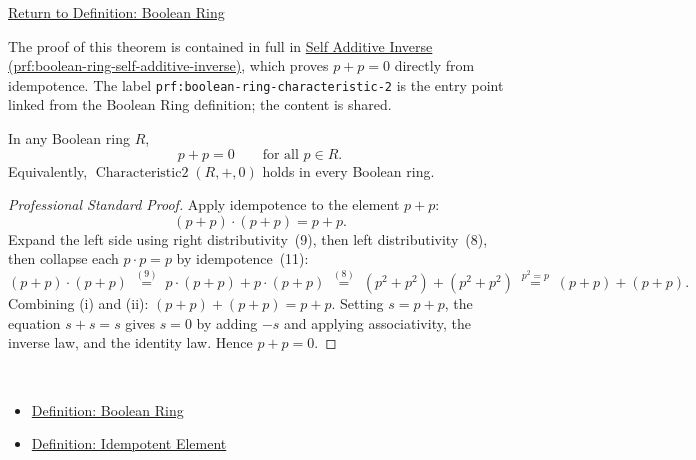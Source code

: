 \newpage
{}
\label{prf:boolean-ring-characteristic-2}

\begin{remark*}[Return]
\hyperref[def:boolean-ring]{Return to Definition: Boolean Ring}
\end{remark*}

\begin{remark*}
The proof of this theorem is contained in full in
\hyperref[prf:boolean-ring-self-additive-inverse]{Self Additive Inverse
(prf:boolean-ring-self-additive-inverse)}, which proves $p + p = 0$ directly
from idempotence. The label \texttt{prf:boolean-ring-characteristic-2} is the
entry point linked from the Boolean Ring definition; the content is shared.
\end{remark*}

\begin{theorem*}
In any Boolean ring $R$,
\[
p + p = 0 \qquad \text{for all } p \in R.
\]
Equivalently, $\operatorname{Characteristic2}(R,+,0)$ holds in every
Boolean ring.
\end{theorem*}

\begin{proof}[Professional Standard Proof]
\LRAProofBodyStart
Apply idempotence to the element $p + p$:
\[
(p + p) \cdot (p + p) = p + p. \tag{i}
\]
Expand the left side using right distributivity~(9), then left
distributivity~(8), then collapse each $p \cdot p = p$ by
idempotence~(11):
\[
(p + p) \cdot (p + p)
  \;\overset{(9)}{=}\; p\cdot(p+p) + p\cdot(p+p)
  \;\overset{(8)}{=}\; (p^2 + p^2) + (p^2 + p^2)
  \;\overset{p^2=p}{=}\; (p + p) + (p + p). \tag{ii}
\]
Combining (i) and (ii): $(p+p) + (p+p) = p+p$.
Setting $s = p+p$, the equation $s + s = s$ gives $s = 0$
by adding $-s$ and applying associativity, the inverse law,
and the identity law.
Hence $p + p = 0$.
\end{proof}

\begin{remark*}[Dependencies]~\\
\begin{itemize}
  \item \hyperref[def:boolean-ring]{Definition: Boolean Ring}
  \item \hyperref[def:idempotent-element]{Definition: Idempotent Element}
\end{itemize}
\end{remark*}
